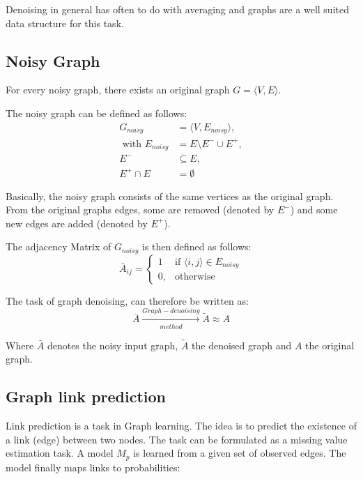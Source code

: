 Denoising in general has often to do with averaging 
 and graphs are  a well suited data structure for this task\cite{noneLocalMean}.

\subsection{Noisy Graph}
For every noisy graph, there exists an original graph $G = \langle V,E \rangle$.

The noisy graph can be defined as follows:
\begin{equation}
    \begin{aligned}
        G_{noisy} &= \langle V,E_{noisy} \rangle,  \\ 
        \text{ with }  E_{noisy} &= E \setminus  E^{-} \cup  E^{+}, \\ 
         E^{-} & \subseteq E, \\
         E^{+} \cap E &= \emptyset
    \end{aligned}
\end{equation}

Basically, the noisy graph consists of the same vertices as the original graph. From
the original graphs edges, some are removed (denoted by $E^{-}$) and some new edges are added
(denoted by $E^{+}$).

The adjacency Matrix of $G_{noisy}$ is then defined as follows:
\begin{equation}
    \bar{A}_{ij} =    
    \begin{cases}
        1  & \text{if } \langle i,j \rangle \in E_{noisy} \\
        0, & \text{otherwise}
    \end{cases}
\end{equation}

The task of graph denoising, can therefore be written as:
\begin{equation}
    \bar{A} \xrightarrow[method]{Graph-denoising} \tilde{A} \approx A
\end{equation}

Where $\bar{A}$ denotes the noisy input graph, $\tilde{A}$ the denoised
 graph and $A$ the original graph.


\subsection{Graph link prediction}
Link prediction is a task in Graph learning. 
The idea is to predict the existence of a link (edge) between two nodes.
The task can be formulated as a missing value estimation task. A model $M_p$ is learned
from a given set of observed edges. The model finally maps links to probabilities:


